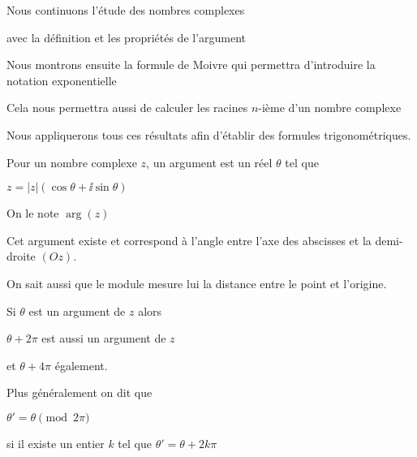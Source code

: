 



\usepackage{mathptmx}



\debuttexte

\diapo

\change

Nous continuons l'étude des nombres complexes

\change

avec la définition et les propriétés de l'argument


\change

Nous montrons ensuite la formule de Moivre
qui permettra d'introduire la notation exponentielle

\change

Cela nous permettra aussi de calculer les racines $n$-ième
d'un nombre complexe

\change

Nous appliquerons tous ces résultats afin d'établir des formules trigonométriques.



\diapo

Pour un nombre complexe $z$, un argument est un réel $\theta$
tel que  

$z=|z|(\cos \theta + \ii \sin \theta)$

\change

On le note $\arg(z)$

\change

Cet argument existe et correspond à l'angle
entre l'axe des abscisses et la demi-droite $(Oz)$.

On sait aussi que le module mesure lui la distance entre le point et l'origine.

\change

Si $\theta$ est un argument de $z$ alors

$\theta+2\pi$ est aussi un argument de $z$

et $\theta+4\pi$ également.

Plus généralement on dit que 

$\theta' = \theta \pmod {2\pi}$

si il existe un entier  $k$ tel que  $\theta' = \theta + 2 k \pi$


